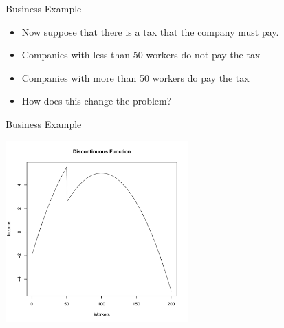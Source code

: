 \documentclass[10pt]{beamer}
\begin{document}
                                                                                              \begin{frame}{Business Example}
                                                                                                \begin{itemize}
                                                                                                \item Now suppose that there is a tax that the company must pay.

                                                                                                \item Companies with less than 50 workers do not pay the tax

                                                                                                \item Companies with more than 50 workers do pay the tax

                                                                                                \item How does this change the problem?
                                                                                                \end{itemize}
                                                                                              \end{frame}
                                                                                              \begin{frame}{Business Example}
                                                                                                \begin{center}
                                                                                                  \includegraphics[height=7cm]{RCode/discontfunc.pdf}
                                                                                                \end{center}
                                                                                              \end{frame}
\end{document}
